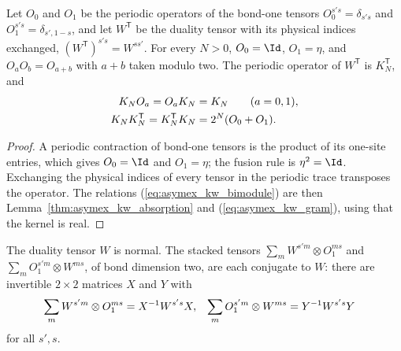 \begin{lemma}
    \label{lem:asymex_kw_bimodule}
    \leanok
    Let $O_0$ and $O_1$ be the periodic operators of the bond-one tensors
    $O_0^{s's}=\delta_{s's}$ and $O_1^{s's}=\delta_{s',1-s}$, and let
    $W^{\mathsf T}$ be the duality tensor with its physical indices
    exchanged, $(W^{\mathsf T})^{s's}=W^{ss'}$. For every $N>0$,
    $O_0=\Id$, $O_1=\eta$, and $O_aO_b=O_{a+b}$ with $a+b$ taken modulo
    two. The periodic operator of $W^{\mathsf T}$ is $K_N^{\mathsf T}$,
    and
    \begin{align}
        K_NO_a=O_aK_N & =K_N\qquad(a=0,1),
        \notag                             \\
        K_NK_N^{\mathsf T}=K_N^{\mathsf T}K_N
                      & =2^N(O_0+O_1).
        \label{eq:asymex_kw_bimodule}
    \end{align}
\end{lemma}

\begin{proof}
    \leanok
    A periodic contraction of bond-one tensors is the product of its
    one-site entries, which gives $O_0=\Id$ and $O_1=\eta$; the fusion
    rule is $\eta^2=\Id$. Exchanging the physical indices of every tensor
    in the periodic trace transposes the operator. The relations
    (\ref{eq:asymex_kw_bimodule}) are then
    Lemma~\ref{thm:asymex_kw_absorption} and
    (\ref{eq:asymex_kw_gram}), using that the kernel is real.
\end{proof}

\begin{lemma}
    \label{thm:asymex_kw_bimodule_absorption}
    \leanok
    The duality tensor $W$ is normal. The stacked tensors
    $\sum_mW^{s'm}\otimes O_1^{ms}$ and $\sum_mO_1^{s'm}\otimes W^{ms}$,
    of bond dimension two, are each conjugate to $W$: there are
    invertible $2\times2$ matrices $X$ and $Y$ with
    \begin{align}
        \sum_mW^{s'm}\otimes O_1^{ms} & =X^{-1}W^{s's}X,
                                      &
        \sum_mO_1^{s'm}\otimes W^{ms} & =Y^{-1}W^{s's}Y
        \notag
    \end{align}
    for all $s',s$.
\end{lemma}

